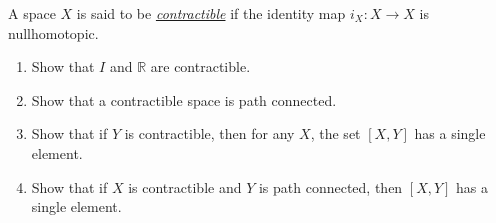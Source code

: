   \begin{exercise}[Munkres 51.3]
    A space $X$ is said to be \textit{\hyperref[def:contractible]{contractible}} if the identity map $i_X : X \to X$ is nullhomotopic.
    \begin{enumerate}
      \item[(a)] Show that $I$ and $\mathbb{R}$ are contractible.
      \item[(b)] Show that a contractible space is path connected.
      \item[(c)] Show that if $Y$ is contractible, then for any $X$, the set $[X, Y]$ has a single element.
      \item[(d)] Show that if $X$ is contractible and $Y$ is path connected, then $[X, Y]$ has a single element.
    \end{enumerate}
  \end{exercise}
